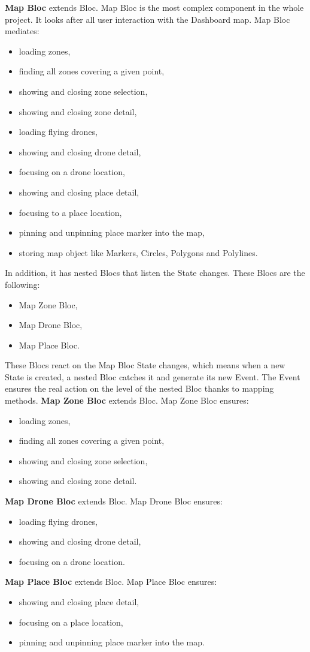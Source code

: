 \textbf{Map Bloc} extends Bloc.
Map Bloc is the most complex component in the whole project.
It looks after all user interaction with the Dashboard map.
Map Bloc mediates:
\begin{itemize}
    \item loading zones,
    \item finding all zones covering a given point,
    \item showing and closing zone selection,
    \item showing and closing zone detail,
    \item loading flying drones,
    \item showing and closing drone detail,
    \item focusing on a drone location,
    \item showing and closing place detail,
    \item focusing to a place location,
    \item pinning and unpinning place marker into the map,
    \item storing map object like Markers, Circles, Polygons and Polylines.
\end{itemize}
In addition, it has nested Blocs that listen the State changes.
These Blocs are the following:
\begin{itemize}
    \item Map Zone Bloc,
    \item Map Drone Bloc,
    \item Map Place Bloc.
\end{itemize}
These Blocs react on the Map Bloc State changes, which means when a new State is created, a nested Bloc catches it and generate its new Event.
The Event ensures the real action on the level of the nested Bloc thanks to mapping methods.
\newline
\newline
\textbf{Map Zone Bloc} extends Bloc.
Map Zone Bloc ensures:
\begin{itemize}
    \item loading zones,
    \item finding all zones covering a given point,
    \item showing and closing zone selection,
    \item showing and closing zone detail.
\end{itemize}
\textbf{Map Drone Bloc} extends Bloc.
Map Drone Bloc ensures:
\begin{itemize}
    \item loading flying drones,
    \item showing and closing drone detail,
    \item focusing on a drone location.
\end{itemize}
\textbf{Map Place Bloc} extends Bloc.
Map Place Bloc ensures:
\begin{itemize}
    \item showing and closing place detail,
    \item focusing on a place location,
    \item pinning and unpinning place marker into the map.
\end{itemize}

